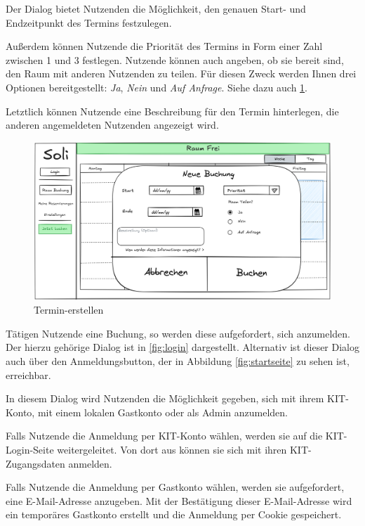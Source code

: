 Der Dialog bietet Nutzenden die Möglichkeit, den genauen Start- und Endzeitpunkt des Termins festzulegen.

Außerdem können Nutzende die Priorität des Termins in Form einer Zahl zwischen 1 und 3 festlegen.
Nutzende können auch angeben, ob sie bereit sind, den Raum mit anderen Nutzenden zu teilen.
Für diesen Zweck werden Ihnen drei Optionen bereitgestellt: \textit{Ja}, \textit{Nein} und \textit{Auf Anfrage}.
Siehe dazu auch \ref{fig:buchung}.

Letztlich können Nutzende eine Beschreibung für den Termin hinterlegen, die anderen angemeldeten Nutzenden angezeigt wird.

\begin{figure}[ht]
    \centering
    \includegraphics[width=\textwidth]{figures/ui/buchungsdialog}
    \caption{Termin-erstellen}
    \label{fig:buchung}
\end{figure}
\clearpage

Tätigen Nutzende eine Buchung, so werden diese aufgefordert, sich anzumelden.
Der hierzu gehörige Dialog ist in \ref{fig:login} dargestellt.
Alternativ ist dieser Dialog auch über den Anmeldungsbutton, der in Abbildung \ref{fig:startseite} zu sehen ist, erreichbar.

In diesem Dialog wird Nutzenden die Möglichkeit gegeben, sich mit ihrem KIT-Konto, mit einem lokalen Gastkonto oder als Admin anzumelden.

Falls Nutzende die Anmeldung per KIT-Konto wählen, werden sie auf die KIT-Login-Seite weitergeleitet.
Von dort aus können sie sich mit ihren KIT-Zugangsdaten anmelden.

Falls Nutzende die Anmeldung per Gastkonto wählen, werden sie aufgefordert, eine E-Mail-Adresse anzugeben.
Mit der Bestätigung dieser E-Mail-Adresse wird ein temporäres Gastkonto erstellt und die Anmeldung per Cookie gespeichert.


